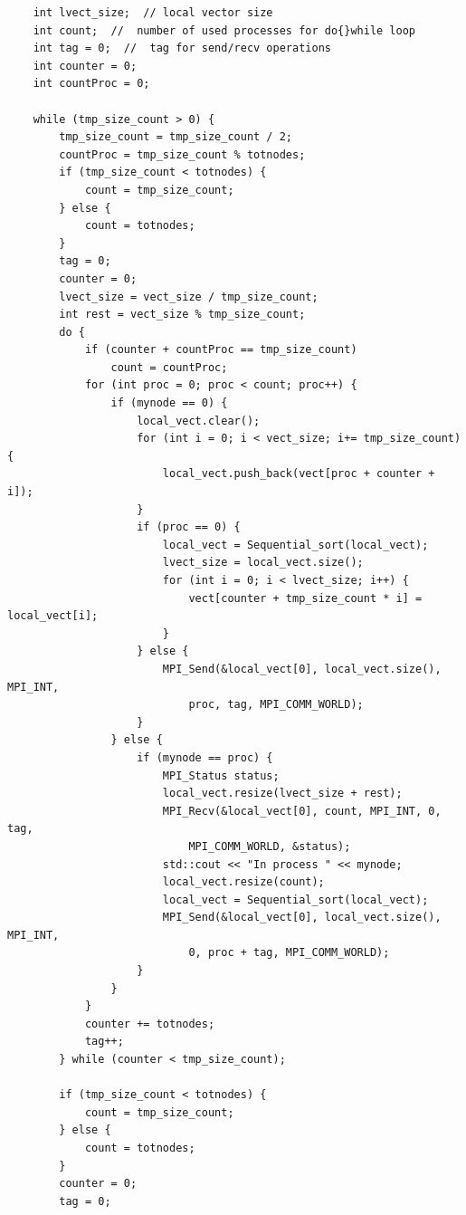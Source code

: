 \documentclass[12pt, letterpaper]{report}
\begin{document}
\begin{verbatim}
    int lvect_size;  // local vector size
    int count;  //  number of used processes for do{}while loop
    int tag = 0;  //  tag for send/recv operations
    int counter = 0;
    int countProc = 0;

    while (tmp_size_count > 0) {
        tmp_size_count = tmp_size_count / 2;
        countProc = tmp_size_count % totnodes;
        if (tmp_size_count < totnodes) {
            count = tmp_size_count;
        } else {
            count = totnodes;
        }
        tag = 0;
        counter = 0;
        lvect_size = vect_size / tmp_size_count;
        int rest = vect_size % tmp_size_count;
        do {
            if (counter + countProc == tmp_size_count)
                count = countProc;
            for (int proc = 0; proc < count; proc++) {
                if (mynode == 0) {
                    local_vect.clear();
                    for (int i = 0; i < vect_size; i+= tmp_size_count) {
                        local_vect.push_back(vect[proc + counter + i]);
                    }
                    if (proc == 0) {
                        local_vect = Sequential_sort(local_vect);
                        lvect_size = local_vect.size();
                        for (int i = 0; i < lvect_size; i++) {
                            vect[counter + tmp_size_count * i] = local_vect[i];
                        }
                    } else {
                        MPI_Send(&local_vect[0], local_vect.size(), MPI_INT, 
                            proc, tag, MPI_COMM_WORLD);
                    }
                } else {
                    if (mynode == proc) {
                        MPI_Status status;
                        local_vect.resize(lvect_size + rest);
                        MPI_Recv(&local_vect[0], count, MPI_INT, 0, tag, 
                            MPI_COMM_WORLD, &status);
                        std::cout << "In process " << mynode;
                        local_vect.resize(count);
                        local_vect = Sequential_sort(local_vect);
                        MPI_Send(&local_vect[0], local_vect.size(), MPI_INT, 
                            0, proc + tag, MPI_COMM_WORLD);
                    }
                }
            }
            counter += totnodes;
            tag++;
        } while (counter < tmp_size_count);

        if (tmp_size_count < totnodes) {
            count = tmp_size_count;
        } else {
            count = totnodes;
        }
        counter = 0;
        tag = 0;


\end{verbatim}
\end{document}
